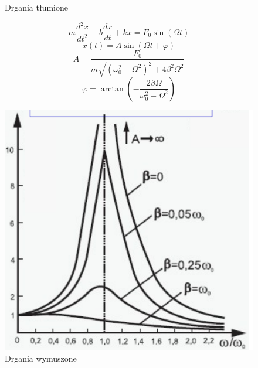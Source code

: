 \documentclass{article}
\begin{document}
\begin{enumerate}
\begin{figure}[h]
			\caption{Drgania tłumione}
			\label{fig:drgania_tlumione}
		\end{figure}
		\[
		m \frac{d^2x}{dt^2} + b \frac{dx}{dt} + kx = F_0 \sin (\Omega t)
		\]
		\[
		x(t) = A \sin (\Omega t + \varphi)
		\]
		\[
		A = \frac{F_0}{m \sqrt{(\omega_0^2 - \Omega^2)^2 + 4 \beta^2 \Omega^2}}
		\]
		\[
		\varphi = \arctan \left( - \frac{2 \beta \Omega}{\omega_0^2 - \Omega^2} \right)
		\]
		\newpage
		\begin{figure}[h]
			\centering
			\includegraphics[width=1 \textwidth]{drgania_wymuszone.png}
			\caption{Drgania wymuszone}
			\label{fig:drgania_wymuszone}
		\end{figure}
	
	\end{enumerate}
	
\end{document}
